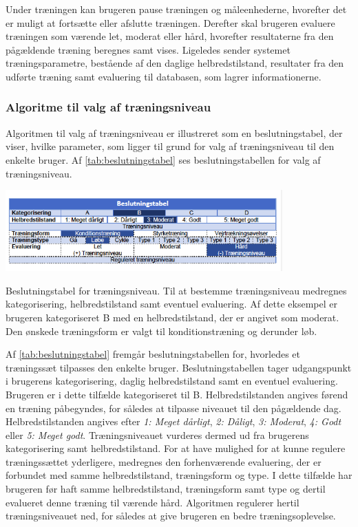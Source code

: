 Under træningen kan brugeren pause træningen og måleenhederne, hvorefter det er muligt at fortsætte eller afslutte træningen. Derefter skal brugeren evaluere træningen som værende let, moderat eller hård, hvorefter resultaterne fra den pågældende træning beregnes samt vises. Ligeledes sender systemet træningsparametre, bestående af den daglige helbredstilstand, resultater fra den udførte træning samt evaluering til databasen, som lagrer informationerne. 

\subsubsection*{Algoritme til valg af træningsniveau}
Algoritmen til valg af træningsniveau er illustreret som en beslutningstabel, der viser, hvilke parameter, som ligger til grund for valg af træningsniveau til den enkelte bruger. Af \autoref{tab:beslutningstabel} ses beslutningstabellen for valg af træningsniveau.

\begin{table}[H]
\centering
\includegraphics[width=0.8\textwidth]{figures/aktivitetsdiagram/beslutningstabel}
\caption{Beslutningstabel for træningsniveau. Til at bestemme træningsniveau medregnes kategorisering, helbredstilstand samt eventuel evaluering. Af dette eksempel er brugeren kategoriseret B med en helbredstilstand, der er angivet som moderat. Den ønskede træningsform er valgt til konditionstræning og derunder løb.}
\label{tab:beslutningstabel}
\end{table} 

Af \autoref{tab:beslutningstabel} fremgår beslutningstabellen for, hvorledes et træningssæt tilpasses den enkelte bruger. Beslutningstabellen tager udgangspunkt i brugerens kategorisering, daglig helbredstilstand samt en eventuel evaluering. Brugeren er i dette tilfælde kategoriseret til B. Helbredstilstanden angives førend en træning påbegyndes, for således at tilpasse niveauet til den pågældende dag. Helbredstilstanden angives efter \textit{1: Meget dårligt}, \textit{2: Dåligt}, \textit{3: Moderat}, \textit{4: Godt} eller \textit{5: Meget godt}.
Træningsniveauet vurderes dermed ud fra brugerens kategorisering samt helbredstilstand. 
For at have mulighed for at kunne regulere træningssættet yderligere, medregnes den forhenværende evaluering, der er forbundet med samme helbredstilstand, træningsform og type. I dette tilfælde har brugeren før haft samme helbredstilstand, træningsform samt type og dertil evalueret denne træning til værende hård. Algoritmen regulerer hertil træningsniveauet ned, for således at give brugeren en bedre træningsoplevelse. 
